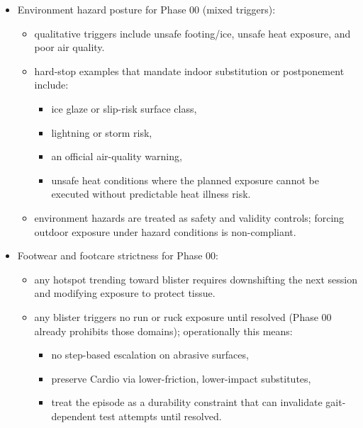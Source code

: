 \documentclass[10pt]{article}
\begin{document}
\begin{itemize}
\begin{itemize}
    \begin{itemize}
    \item two consecutive nights under 6 hours, or
    \item sleep quality at or below 3 out of 10 for three nights.
    \end{itemize}
  \item response is conservative intensity reduction and density reduction; preserve the six-session rhythm using Minimum Viable Sessions.
  \end{itemize}
\item Environment hazard posture for Phase 00 (mixed triggers):
  \begin{itemize}
  \item qualitative triggers include unsafe footing/ice, unsafe heat exposure, and poor air quality.
  \item hard-stop examples that mandate indoor substitution or postponement include:
    \begin{itemize}
    \item ice glaze or slip-risk surface class,
    \item lightning or storm risk,
    \item an official air-quality warning,
    \item unsafe heat conditions where the planned exposure cannot be executed without predictable heat illness risk.
    \end{itemize}
  \item environment hazards are treated as safety and validity controls; forcing outdoor exposure under hazard conditions is non-compliant.
  \end{itemize}
\item Footwear and footcare strictness for Phase 00:
  \begin{itemize}
  \item any hotspot trending toward blister requires downshifting the next session and modifying exposure to protect tissue.
  \item any blister triggers no run or ruck exposure until resolved (Phase 00 already prohibits those domains); operationally this means:
    \begin{itemize}
    \item no step-based escalation on abrasive surfaces,
    \item preserve Cardio via lower-friction, lower-impact substitutes,
    \item treat the episode as a durability constraint that can invalidate gait-dependent test attempts until resolved.

\end{itemize}
\end{itemize}
\end{itemize}
\end{document}
